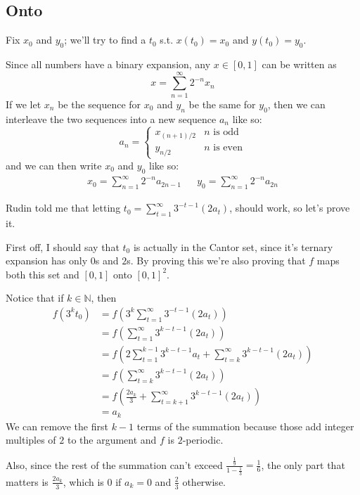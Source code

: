 \documentclass[12pt]{article}
\newcommand{\N}{\mathbb{N}}
\begin{document}
\pagebreak

\subsection{Onto}

Fix $x_0$ and $y_0$; we'll try to find a $t_0$ s.t. $x(t_0)=x_0$ and $y(t_0)=y_0$.

Since all numbers have a binary expansion, any $x \in [0, 1]$ can be written as
\[x=\sum_{n=1}^{\infty} 2^{-n}x_n\]
If we let $x_n$ be the sequence for $x_0$ and $y_n$ be the same for $y_0$, then
we can interleave the two sequences into a new sequence $a_n$ like so:
\[a_n=\begin{cases}
    x_{(n+1)/2} & \text{$n$ is odd}  \\
    y_{n/2}     & \text{$n$ is even}
  \end{cases}\]
and we can then write $x_0$ and $y_0$ like so:
\begin{align*}
  x_0=\sum_{n=1}^{\infty} 2^{-n}a_{2n-1} &  &
  y_0=\sum_{n=1}^{\infty} 2^{-n}a_{2n}
\end{align*}

Rudin told me that letting $t_0=\sum_{t=1}^{\infty} 3^{-t-1}(2a_t)$, should work, so let's prove it.

First off, I should say that $t_0$ is actually in the Cantor set,
since it's ternary expansion has only $0$s and $2$s.
By proving this we're also proving that $f$ maps both this set and $[0, 1]$ onto $[0, 1]^2$.

Notice that if $k \in \N$, then
\begin{align*}
  f\left(3^kt_0\right)
   & = f\left(3^k\sum_{t=1}^{\infty} 3^{-t-1}(2a_t)\right)                              \\
   & = f\left(\sum_{t=1}^{\infty} 3^{k-t-1}(2a_t)\right)                                \\
   & = f\left(2\sum_{t=1}^{k-1} 3^{k-t-1}a_t+\sum_{t=k}^{\infty} 3^{k-t-1}(2a_t)\right) \\
   & = f\left(\sum_{t=k}^{\infty} 3^{k-t-1}(2a_t)\right)                                \\
   & = f\left(\frac{2a_k}{3}+\sum_{t=k+1}^{\infty} 3^{k-t-1}(2a_t)\right)               \\
   & = a_k
\end{align*}
We can remove the first $k-1$ terms of the summation because
those add integer multiples of $2$ to the argument and $f$ is $2$-periodic.

Also, since the rest of the summation can't exceed $\frac{\frac{1}{9}}{1-\frac{1}{3}}=\frac{1}{6}$,
the only part that matters is $\frac{2a_k}{3}$, which is $0$ if $a_k=0$ and $\frac{2}{3}$ otherwise.
\end{document}
